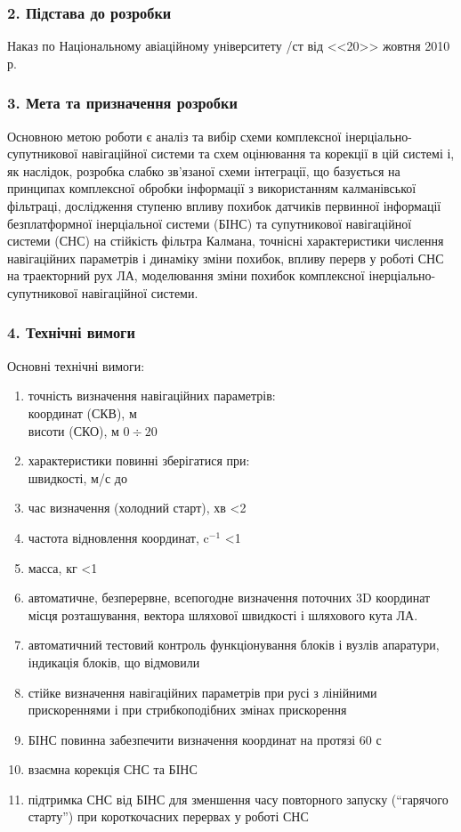 \subsubsection*{2. Підстава до розробки}

Наказ по Національному авіаційному університету /ст від <<20>> жовтня 2010 р.

\subsubsection*{3. Мета та призначення розробки}

Основною метою роботи є аналіз та вибір схеми комплексної інерціально-супутникової 
навігаційної системи та схем оцінювання та корекції в цій системі і, як наслідок, 
розробка слабко зв’язаної схеми інтеграції, що базується на принципах комплексної 
обробки інформації з використанням калманівської фільтраці, дослідження ступеню 
впливу похибок датчиків первинної інформації  безплатформної інерціальної системи 
(БІНС) та супутникової навігаційної системи (СНС) на стійкість фільтра Калмана, 
точнісні характеристики числення навігаційних параметрів і динаміку зміни похибок, 
впливу перерв у роботі СНС на траекторний рух ЛА, моделювання зміни похибок 
комплексної інерціально-супутникової навігаційної системи.

\subsubsection*{4. Технічні вимоги}

Основні технічні вимоги:
\begin{enumerate}
      \item точність визначення навігаційних параметрів:\\
  координат (СКВ), м \\
  висоти (СКО), м \dotfill $0\div20$
     \item характеристики повинні зберігатися при:\\
швидкості, м/с до 
     \item час визначення (холодний старт), хв \dotfill <2
     \item частота відновлення координат, c$^{-1}$ \dotfill <1
     \item масса, кг \dotfill <1
     \item автоматичне, безперервне, всепогодне визначення 
поточних 3D координат місця розташування, вектора шляхової 
швидкості і шляхового кута ЛА.
    \item автоматичний тестовий контроль функціонування блоків і 
вузлів апаратури, індикація блоків, що відмовили
    \item стійке визначення навігаційних параметрів при русі з 
лінійними прискореннями і при стрибкоподібних змінах прискорення
    \item БІНС повинна забезпечити визначення координат на протязі 60 с
    \item взаємна корекція СНС та БІНС
    \item підтримка СНС від БІНС для зменшення часу повторного 
запуску (“гарячого старту”) при короткочасних перервах у роботі СНС
\end{enumerate}

